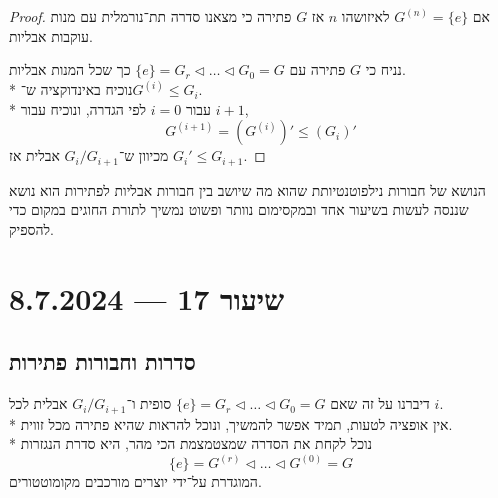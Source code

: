 \begin{proof}
	אם $G^{(n)} = \{e\}$ לאיזושהו $n$ אז $G$ פתירה כי מצאנו סדרה תת־נורמלית עם מנות עוקבות אבליות.

	נניח כי $G$ פתירה עם $\{e\} = G_r \triangleleft \dots \triangleleft G_0 = G$ כך שכל המנות אבליות. \\*
	נוכיח באינדוקציה ש־$G^{(i)} \le G_i$. \\*
	עבור $i = 0$ לפי הגדרה, ונוכיח עבור $i + 1$,
	\[
		G^{(i + 1)} = (G^{(i)})' \le (G_i)'
	\]
	מכיוון ש־$G_i / G_{i + 1}$ אבלית אז $G_i' \le G_{i + 1}$.
\end{proof}
הנושא של חבורות נילפוטנטיותת שהוא מה שיושב בין חבורות אבליות לפתירות הוא נושא שננסה לעשות בשיעור אחד ובמקסימום נוותר ופשוט נמשיך לתורת החוגים במקום כדי להספיק.

\section{שיעור 17 --- 8.7.2024}
\subsection{סדרות וחבורות פתירות}
דיברנו על זה שאם $\{ e \} = G_r \triangleleft \dots \triangleleft G_0 = G$ סופית ו־$G_i / G_{i + 1}$ אבלית לכל $i$. \\*
אין אופציה לטעות, תמיד אפשר להמשיך, ונוכל להראות שהיא פתירה מכל זווית. \\*
נוכל לקחת את הסדרה שמצטמצמת הכי מהר, היא סדרת הנגזרות
\[
	\{ e \} = G^{(r)} \triangleleft \dots \triangleleft G^{(0)} = G
\]
המוגדרת על־ידי יוצרים מורכבים מקומוטטורים.

